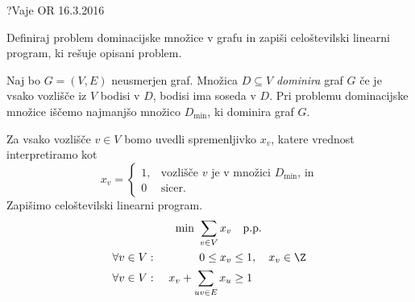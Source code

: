 \begin{naloga}{?}{Vaje OR 16.3.2016}
\begin{vprasanje}
Definiraj problem dominacijske množice v grafu
in zapiši celoštevilski linearni program,
ki rešuje opisani problem.
\end{vprasanje}

\begin{odgovor}
Naj bo $G = (V, E)$ neusmerjen graf.
Množica $D \subseteq V$ {\em dominira} graf $G$
če je vsako vozlišče iz $V$ bodisi v $D$, bodisi ima soseda v $D$.
Pri problemu dominacijske množice iščemo najmanjšo množico $D_{\min}$,
ki dominira graf $G$.

Za vsako vozlišče $v \in V$ bomo uvedli spremenljivko $x_v$,
katere vrednost interpretiramo kot
$$
x_v = \begin{cases}
1, & \text{vozlišče $v$ je v množici $D_{\min}$, in} \\
0  & \text{sicer.}
\end{cases}
$$
Zapišimo celoštevilski linearni program.
\begin{alignat*}{2}
&& \min \ \sum_{v \in V} x_v &\quad \text{p.p.} \\
\forall v \in V: &\ & 0 \le x_v &\le 1, \quad x_v \in \Z \\
\forall v \in V: &\ & x_v + \sum_{uv \in E} x_u &\ge 1
\end{alignat*}
\end{odgovor}
\end{naloga}
